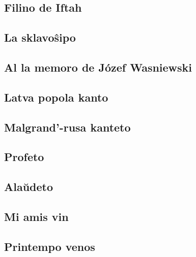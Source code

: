 \documentclass[a5paper,11pt,openany,twoside]{book}
\begin{document}
\subsection{Filino de Iftah}
\label{filino}

\subsection{La sklavo\^sipo}
\label{sklavo}


\subsection{Al la memoro de J\'ozef Wasniewski}
\label{memoro}


\subsection{Latva popola kanto}
\label{latva}


\subsection{Malgrand'-rusa kanteto}
\label{malgrand}

\subsection{Profeto}
\label{profeto}


\vspace*{-5ex} %

\subsection{Ala\u udeto}
\label{alauxdeto}


\vspace*{-5ex} %

\subsection{Mi amis vin}
\label{miamasvin}

\subsection{Printempo venos}
\label{printempovenos}

\end{document}
